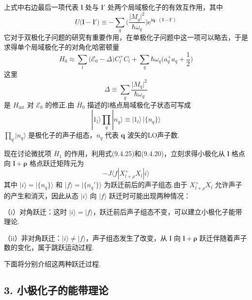上式中右边最后一项代表 $\boldsymbol{l}$ 处与 $\boldsymbol{l}'$ 处两个局域极化子的有效互作用，其中
\begin{equation}
  U\bigl(\boldsymbol{l}-\boldsymbol{l}'\bigr)\equiv
  -\sum_{q}\biggl(\frac{\bigl|M_{q}\bigr|^{2}}{\hbar\omega_{q}}\biggr)
  \mathrm{e}^{\mathrm{i}\boldsymbol{q}\cdot(\boldsymbol{l}-\boldsymbol{l}')}
\end{equation}
它对于双极化子问题的研究有重要作用，在单极化子问题中这一项可以略去，于是求得单个局域极化子的对角化哈密顿量
\begin{equation}
  H_{0}\approx\sum_{l}\bigl(\mathscr{E}_{0}-\Delta\bigr)C_{l}^{+}C_{l}
  +\sum_{q}\hbar\omega_{q}\biggl(a_{q}^{+}a_{q}+\frac{1}{2}\biggr)
\end{equation}
这里
\begin{equation}
  \Delta\equiv\sum_{q}\frac{\bigl|M_{q}\bigr|^{2}}{\hbar\omega_{q}}
\end{equation}
是 $H_{\mathrm{int}}$ 对 $\mathscr{E}_{0}$ 的修正.由 $\overline{H}_{0}$ 描述的l格点局域极化子状态可写成
\begin{equation}
  |1_{l}\rangle\prod_{q}|n_{q}\rangle
  \equiv|1_{l}\rangle\,|\{n_{q}\}\rangle
\end{equation}
$\prod\limits_{q}|n_{q}\rangle$ 是极化子的声子组态，$n_{q}$ 代表 $\boldsymbol{q}$ 波矢的LO声子数.

现在讨论微扰项 $\overline{H}_{1}$ 的作用，利用式(9.4.25)和(9.4.20)，立刻求得小极化从 $\boldsymbol{l}$ 格点向 $\boldsymbol{l}+\boldsymbol{\rho}$ 格点跃迁矩阵元为
\begin{equation*}
  -J\langle f|X_{l+\rho}^{+}X_{l}|i\rangle
\end{equation*}
其中 $|i\rangle=|\{n_{q}\}\rangle$ 和 $|f\rangle=|\{n_{q}'\}\rangle$ 为跃迁前后的声子组态.由于 $X_{l+\rho}^{+}X_{l}$ 允许声子的产生和消灭，因此从态 $|i\rangle$ 向 $|f\rangle$ 跃迁时可能出现两种情况：

（i）对角跃迁：这时 $|i\rangle=|f\rangle$，跃迁前后声子组态不变，可以建立小极化子能带理论.

（ii）非对角跃迁：$|i\rangle\neq|f\rangle$，声子组态发生了改变，从 $\boldsymbol{l}$ 向 $\boldsymbol{l}+\boldsymbol{\rho}$ 跃迁伴随着声子数的变化，属于跳跃运动过程.

下面将分别介绍这两种跃迁过程.

\subsection*{3. 小极化子的能带理论}

